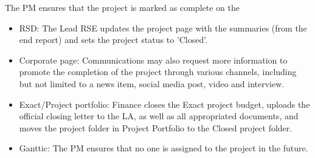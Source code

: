 The PM ensures that the project is marked as complete on the 
\begin{itemize}
\item RSD: The Lead RSE updates the project page with the summaries (from the end report) and sets the project status to
'Closed'. 
\item Corporate page: Communications may also request more information to promote the completion of the project through
various channels, including but not limited to a news item, social media post, video and interview.
\item Exact/Project portfolio: Finance closes the Exact project budget, uploads the official closing letter to the LA, as well as
all appropriated documents, and moves the project folder in Project Portfolio to the Closed project folder.
\item Ganttic: The PM ensures that no one is assigned to the project in the future.
\end{itemize}

